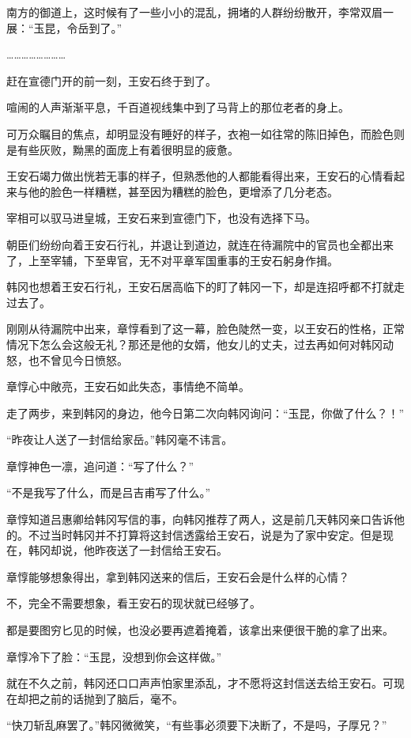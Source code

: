 南方的御道上，这时候有了一些小小的混乱，拥堵的人群纷纷散开，李常双眉一展：“玉昆，令岳到了。”

……………………

赶在宣德门开的前一刻，王安石终于到了。

喧闹的人声渐渐平息，千百道视线集中到了马背上的那位老者的身上。

可万众瞩目的焦点，却明显没有睡好的样子，衣袍一如往常的陈旧掉色，而脸色则是有些灰败，黝黑的面庞上有着很明显的疲惫。

王安石竭力做出恍若无事的样子，但熟悉他的人都能看得出来，王安石的心情看起来与他的脸色一样糟糕，甚至因为糟糕的脸色，更增添了几分老态。

宰相可以驭马进皇城，王安石来到宣德门下，也没有选择下马。

朝臣们纷纷向着王安石行礼，并退让到道边，就连在待漏院中的官员也全都出来了，上至宰辅，下至卑官，无不对平章军国重事的王安石躬身作揖。

韩冈也想着王安石行礼，王安石居高临下的盯了韩冈一下，却是连招呼都不打就走过去了。

刚刚从待漏院中出来，章惇看到了这一幕，脸色陡然一变，以王安石的性格，正常情况下怎么会这般无礼？那还是他的女婿，他女儿的丈夫，过去再如何对韩冈动怒，也不曾见今日愤怒。

章惇心中敞亮，王安石如此失态，事情绝不简单。

走了两步，来到韩冈的身边，他今日第二次向韩冈询问：“玉昆，你做了什么？！”

“昨夜让人送了一封信给家岳。”韩冈毫不讳言。

章惇神色一凛，追问道：“写了什么？”

“不是我写了什么，而是吕吉甫写了什么。”

章惇知道吕惠卿给韩冈写信的事，向韩冈推荐了两人，这是前几天韩冈亲口告诉他的。不过当时韩冈并不打算将这封信透露给王安石，说是为了家中安定。但是现在，韩冈却说，他昨夜送了一封信给王安石。

章惇能够想象得出，拿到韩冈送来的信后，王安石会是什么样的心情？

不，完全不需要想象，看王安石的现状就已经够了。

都是要图穷匕见的时候，也没必要再遮着掩着，该拿出来便很干脆的拿了出来。

章惇冷下了脸：“玉昆，没想到你会这样做。”

就在不久之前，韩冈还口口声声怕家里添乱，才不愿将这封信送去给王安石。可现在却把之前的话抛到了脑后，毫不。

“快刀斩乱麻罢了。”韩冈微微笑，“有些事必须要下决断了，不是吗，子厚兄？”

